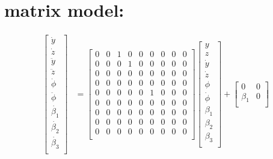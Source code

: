 \documentclass[12pt]{article}
\begin{document}
\section*{matrix model:}
\begin{align*}
    \begin{bmatrix}
        \dot{y} \\
        \dot{z} \\
        \ddot{y} \\
        \ddot{z} \\
        \dot{\phi} \\
        \ddot{\phi} \\
        \dot{\beta_1} \\
        \dot{\beta_2} \\
        \dot{\beta_3} \\
    \end{bmatrix} &=
    \begin{bmatrix}
        0 & 0 & 1 & 0 & 0 & 0 & 0 & 0 & 0 \\
        0 & 0 & 0 & 1 & 0 & 0 & 0 & 0 & 0 \\
        0 & 0 & 0 & 0 & 0 & 0 & 0 & 0 & 0 \\
        0 & 0 & 0 & 0 & 0 & 0 & 0 & 0 & 0 \\
        0 & 0 & 0 & 0 & 0 & 1 & 0 & 0 & 0 \\
        0 & 0 & 0 & 0 & 0 & 0 & 0 & 0 & 0 \\
        0 & 0 & 0 & 0 & 0 & 0 & 0 & 0 & 0 \\
        0 & 0 & 0 & 0 & 0 & 0 & 0 & 0 & 0 \\
        0 & 0 & 0 & 0 & 0 & 0 & 0 & 0 & 0 \\
    \end{bmatrix}
    \begin{bmatrix}
        y \\
        z \\
        \dot{y} \\
        \dot{z} \\
        \phi \\
        \dot{\phi} \\
        \beta_1 \\
        \beta_2 \\
        \beta_3 \\
    \end{bmatrix} +
    \begin{bmatrix}
        0 & 0 \\
        \beta_1 & 0 \\

\end{bmatrix}
\end{align*}
\end{document}
